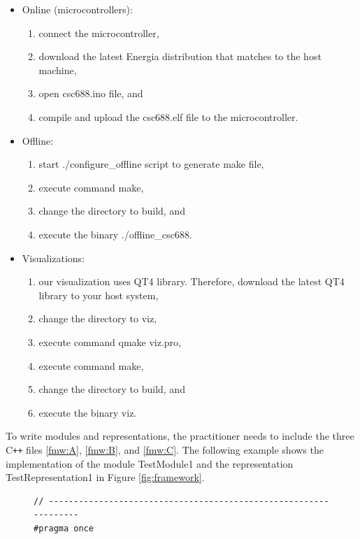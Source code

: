 \documentclass{llncs}
\begin{document}
\begin{sloppy}
\begin{itemize}
 \item Online (microcontrollers):
\begin{enumerate}
\item connect the microcontroller,
\item download the latest Energia distribution that matches to the host machine,
\item open {\sf csc688.ino} file, and 
\item compile and upload the {\sf csc688.elf} file to the microcontroller.
\end{enumerate}

\item Offline:
\begin{enumerate}
\item start {\sf ./configure\_offline} script to generate make file,
\item execute command {\sf make},
\item change the directory to {\sf build}, and 
\item execute the binary {./offline\_csc688}.
\end{enumerate}

\item Visualizations:
\begin{enumerate}
\item our visualization uses QT4 library. Therefore, download the latest QT4 library to your host
system,
\item change the directory to {\sf viz},
\item execute command {\sf qmake viz.pro},
\item execute command {\sf make},
\item change the directory to {\sf build}, and 
\item execute the binary {\sf viz}.
\end{enumerate}

\end{itemize}


To write modules and representations, the practitioner needs to include the three C\texttt{++}
files \ref{fmw:A}, \ref{fmw:B}, and \ref{fmw:C}. The following example shows the implementation
of the module {\sf TestModule1} and the representation {\sf TestRepresentation1} in Figure
\ref{fig:framework}.

\begin{figure}[!ht]
\begin{center}
\begin{verbatim}
// -----------------------------------------------------------------
#pragma once


\end{verbatim}
\end{center}
\end{figure}
\end{sloppy}
\end{document}
